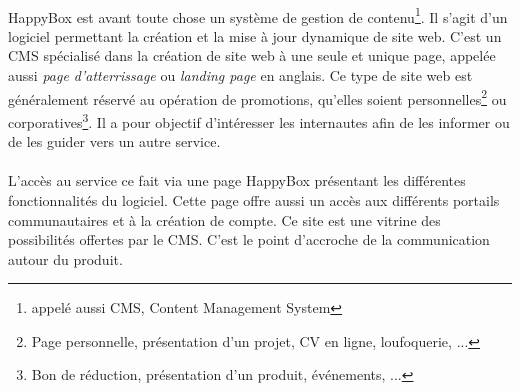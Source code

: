 \documentclass[11pt, a4paper ]{article}
\begin{document}
\begin{spacing}{1.5}
	\paragraph{}
HappyBox est avant toute chose un système de gestion de contenu\footnote{appelé aussi CMS, Content Management System}. Il s'agit d'un logiciel permettant la création et la mise à jour dynamique de site web.
C'est un CMS spécialisé dans la création de site web à une seule et unique page, appelée aussi \emph{page d’atterrissage} ou \emph{landing page} en anglais. Ce type de site web est généralement réservé au opération de promotions, qu'elles soient personnelles\footnote{Page personnelle, présentation d'un projet, CV en ligne, loufoquerie, ...} ou corporatives\footnote{Bon de réduction, présentation d'un produit, événements, ...}. Il a pour objectif d'intéresser les internautes afin de les informer ou de les guider vers un autre service.



\paragraph{}
L’accès au service ce fait via une page HappyBox présentant les différentes fonctionnalités du logiciel. Cette page offre aussi un accès aux différents portails communautaires et à la création de compte. Ce site est une vitrine des possibilités offertes par le CMS. C'est le point d'accroche de la communication autour du produit.



\end{spacing}
\end{document}
